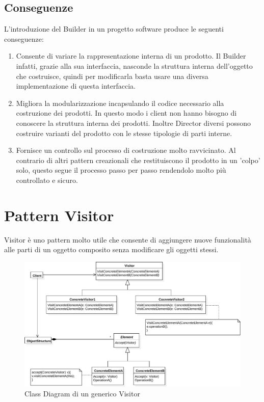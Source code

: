 \subsection{Conseguenze}
L'introduzione del Builder in un progetto software produce le seguenti conseguenze:
\begin{enumerate}
\item Consente di variare la rappresentazione interna di un prodotto. Il Builder infatti, grazie alla sua interfaccia, nasconde la struttura interna dell'oggetto che costruisce, quindi per modificarla basta usare una diversa implementazione di questa interfaccia.
\item Migliora la modularizzazione incapsulando il codice necessario alla costruzione dei prodotti. In questo modo i client non hanno bisogno di conoscere la struttura interna dei prodotti. Inoltre Director diversi possono costruire varianti del prodotto con le stesse tipologie di parti interne.
\item Fornisce un controllo sul processo di costruzione molto ravvicinato. Al contrario di altri pattern creazionali che restituiscono il prodotto in un 'colpo' solo, questo segue il processo passo per passo rendendolo molto più controllato e sicuro.
\end{enumerate}

\section{Pattern Visitor}
\label{sec:visitor}
Visitor è uno pattern molto utile che consente di aggiungere nuove funzionalità alle parti di un oggetto composito senza modificare gli oggetti stessi.
\begin{figure}[htbp]
\centering
\includegraphics[width=\textwidth,height=\textheight,keepaspectratio]{images/visitor-design-pattern.pdf}
\caption{Class Diagram di un generico Visitor}
\label{fig:visitor-design-pattern}
\end{figure}

